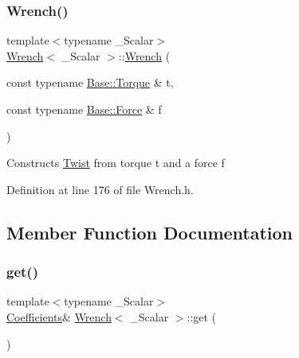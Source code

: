 \hypertarget{class_wrench_a5674ee39466b179af823f10a07427b3a}{}\label{class_wrench_a5674ee39466b179af823f10a07427b3a} 
\subsubsection{\texorpdfstring{Wrench()}{Wrench()}\hspace{0.1cm}{\footnotesize\ttfamily [7/7]}}
{\footnotesize\ttfamily template$<$typename \+\_\+\+Scalar$>$ \\
\hyperlink{class_wrench}{Wrench}$<$ \+\_\+\+Scalar $>$\+::\hyperlink{class_wrench}{Wrench} (\begin{DoxyParamCaption}\item[{const typename \hyperlink{class_wrench_base_a8fa1b5e32e8418247118cc24be70d68d}{Base\+::\+Torque} \&}]{t,  }\item[{const typename \hyperlink{class_wrench_base_aa589699bbf0d18c023a0a2fe6482b4a7}{Base\+::\+Force} \&}]{f }\end{DoxyParamCaption})\hspace{0.3cm}{\ttfamily [inline]}}

Constructs \hyperlink{class_twist}{Twist} from torque {\ttfamily t} and a force {\ttfamily f} 

Definition at line 176 of file Wrench.\+h.



\subsection{Member Function Documentation}
\hypertarget{class_wrench_abb89a8f4d5642c705ec591f02daaf11a}{}\label{class_wrench_abb89a8f4d5642c705ec591f02daaf11a} 
\subsubsection{\texorpdfstring{get()}{get()}\hspace{0.1cm}{\footnotesize\ttfamily [1/2]}}
{\footnotesize\ttfamily template$<$typename \+\_\+\+Scalar$>$ \\
\hyperlink{class_wrench_a3b7401ec055bd386fc3dc826308784e8}{Coefficients}\& \hyperlink{class_wrench}{Wrench}$<$ \+\_\+\+Scalar $>$\+::get (\begin{DoxyParamCaption}{ }\end{DoxyParamCaption})\hspace{0.3cm}{\ttfamily [inline]}}

